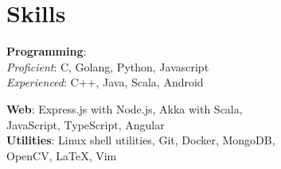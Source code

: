 \section*{\sc Skills}
\vspace{-2mm}
\hrulefill
\vspace{2mm}

\textbf{Programming}:\\
\quad \textit{Proficient}: C, Golang, Python, Javascript\\
\quad \textit{Experienced}: C++, Java, Scala, Android

\textbf{Web}:
Express.js with Node.js, Akka with Scala,\\
\quad JavaScript, TypeScript, Angular\\

\textbf{Utilities}:
Linux shell utilities, Git, Docker, MongoDB,\\
\quad OpenCV, \LaTeX, Vim
